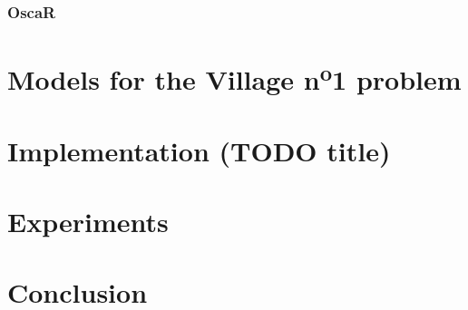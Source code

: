 \documentclass{template/EPL-master-thesis-covers-EN}
\begin{document}
  \subsection{OscaR}
  \label{subsection:oscar}
  
  
  \chapter{Models for the Village n\textsuperscript{o}1 problem}
  \label{chapter:models}

  
  
  
  

  \chapter{Implementation (TODO title)}
  \label{chapter:implementation}
  


  \chapter{Experiments}
  \label{chapter:experiments}
  
  

  \chapter{Conclusion}
  \label{chapter:conclusion}

   
  

  \backcoverpage
\end{document}
